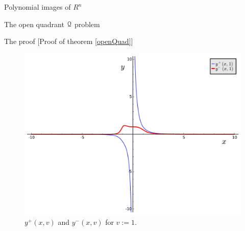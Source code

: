 \documentclass[11pt, a4paper, english, twoside, notitlepage, openright]{report}
\begin{document}
\begin{chapter}{Polynomial images of $R^n$}
\begin{section}{The open quadrant $\mathcal{Q}$ problem}
\begin{subsection}{The proof} [Proof of theorem \ref{openQuad}]
\begin{figure}[h]
\includegraphics[width=1\textwidth]{plots/ch1_07_sols_1.pdf}
\caption{$y^+(x,v)$ and $y^-(x,v)$ for $v:=1$.\label{fig:plotYs_2}}
\end{figure}


\end{subsection}
\end{section}
\end{chapter}
\end{document}
